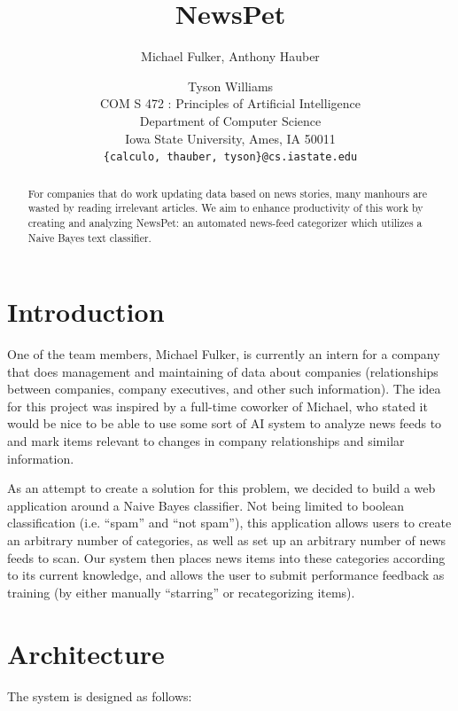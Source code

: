 \documentclass[letterpaper]{article}
\title{NewsPet}
\author{Michael Fulker, Anthony Hauber \and Tyson Williams \\
COM S 472 : Principles of Artificial Intelligence\\Department of Computer Science\\ Iowa State University, Ames, IA 50011\\
\texttt{\{calculo, thauber, tyson\}@cs.iastate.edu}}
\begin{document}
\nocopyright
\maketitle

\begin{abstract}
For companies that do work updating data based on news stories, many manhours are wasted by reading irrelevant articles.
We aim to enhance productivity of this work by creating and analyzing NewsPet: an automated news-feed categorizer which utilizes a Naive Bayes text classifier.
\end{abstract}

\section{Introduction}
One of the team members, Michael Fulker, is currently an intern for a company that does management and maintaining of data about companies (relationships between companies, company executives, and other such information).
The idea for this project was inspired by a full-time coworker of Michael, who stated it would be nice to be able to use some sort of AI system to analyze news feeds to and mark items relevant to changes in company relationships and similar information.

As an attempt to create a solution for this problem, we decided to build a web application around a Naive Bayes classifier. Not being limited to boolean classification (i.e. ``spam'' and ``not spam''), this application allows users to create an arbitrary number of categories, as well as set up an arbitrary number of news feeds to scan. Our system then places news items into these categories according to its current knowledge, and allows the user to submit performance feedback as training (by either manually ``starring'' or recategorizing items).

\pagebreak
\section{Architecture}
The system is designed as follows:
\end{document}
